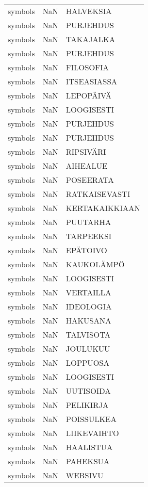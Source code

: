 \begin{tabular}{lll}
 symbols &  NaN &       HALVEKSIA \\
 symbols &  NaN &       PURJEHDUS \\
 symbols &  NaN &       TAKAJALKA \\
 symbols &  NaN &       PURJEHDUS \\
 symbols &  NaN &       FILOSOFIA \\
 symbols &  NaN &     ITSEASIASSA \\
 symbols &  NaN &       LEPOPÄIVÄ \\
 symbols &  NaN &      LOOGISESTI \\
 symbols &  NaN &       PURJEHDUS \\
 symbols &  NaN &       PURJEHDUS \\
 symbols &  NaN &       RIPSIVÄRI \\
 symbols &  NaN &        AIHEALUE \\
 symbols &  NaN &       POSEERATA \\
 symbols &  NaN &   RATKAISEVASTI \\
 symbols &  NaN &  KERTAKAIKKIAAN \\
 symbols &  NaN &        PUUTARHA \\
 symbols &  NaN &       TARPEEKSI \\
 symbols &  NaN &        EPÄTOIVO \\
 symbols &  NaN &      KAUKOLÄMPÖ \\
 symbols &  NaN &      LOOGISESTI \\
 symbols &  NaN &       VERTAILLA \\
 symbols &  NaN &       IDEOLOGIA \\
 symbols &  NaN &        HAKUSANA \\
 symbols &  NaN &       TALVISOTA \\
 symbols &  NaN &        JOULUKUU \\
 symbols &  NaN &        LOPPUOSA \\
 symbols &  NaN &      LOOGISESTI \\
 symbols &  NaN &       UUTISOIDA \\
 symbols &  NaN &       PELIKIRJA \\
 symbols &  NaN &      POISSULKEA \\
 symbols &  NaN &     LIIKEVAIHTO \\
 symbols &  NaN &       HAALISTUA \\
 symbols &  NaN &        PAHEKSUA \\
 symbols &  NaN &         WEBSIVU \\

\end{tabular}
